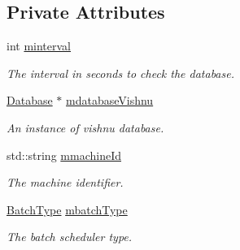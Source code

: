 \subsection*{Private Attributes}
\begin{DoxyCompactItemize}
\item 
\hypertarget{classMonitorTMS_a962f824f2c25e05e96f85c8df08107fc}{
int \hyperlink{classMonitorTMS_a962f824f2c25e05e96f85c8df08107fc}{minterval}}
\label{classMonitorTMS_a962f824f2c25e05e96f85c8df08107fc}

\begin{DoxyCompactList}\small\item\em The interval in seconds to check the database. \item\end{DoxyCompactList}\item 
\hypertarget{classMonitorTMS_a675da4ed6d206b554c602a8c4332e210}{
\hyperlink{classDatabase}{Database} $\ast$ \hyperlink{classMonitorTMS_a675da4ed6d206b554c602a8c4332e210}{mdatabaseVishnu}}
\label{classMonitorTMS_a675da4ed6d206b554c602a8c4332e210}

\begin{DoxyCompactList}\small\item\em An instance of vishnu database. \item\end{DoxyCompactList}\item 
\hypertarget{classMonitorTMS_a0d87f5cbb5e1e4cdc0844894de61e25b}{
std::string \hyperlink{classMonitorTMS_a0d87f5cbb5e1e4cdc0844894de61e25b}{mmachineId}}
\label{classMonitorTMS_a0d87f5cbb5e1e4cdc0844894de61e25b}

\begin{DoxyCompactList}\small\item\em The machine identifier. \item\end{DoxyCompactList}\item 
\hypertarget{classMonitorTMS_a1684e72f6b30bd2e9a1286a04b4d3ebd}{
\hyperlink{utilVishnu_8hpp_a864d748e7097d176552dd4c7635016ea}{BatchType} \hyperlink{classMonitorTMS_a1684e72f6b30bd2e9a1286a04b4d3ebd}{mbatchType}}
\label{classMonitorTMS_a1684e72f6b30bd2e9a1286a04b4d3ebd}

\begin{DoxyCompactList}\small\item\em The batch scheduler type. \item\end{DoxyCompactList}\end{DoxyCompactItemize}


